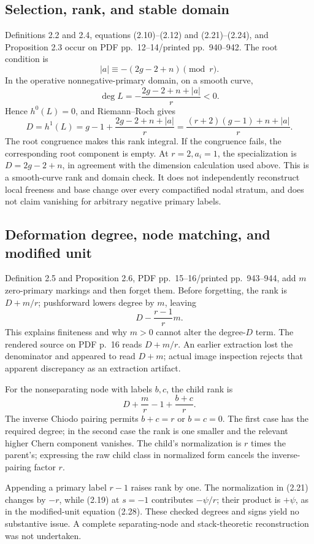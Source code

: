 \documentclass[10pt]{article}
\begin{document}
\subsection*{Selection, rank, and stable domain}
Definitions 2.2 and 2.4, equations (2.10)–(2.12) and (2.21)–(2.24), and Proposition 2.3 occur on PDF pp. 12–14/printed pp. 940–942. The root condition is \[|a|\equiv-(2g-2+n)\pmod r.\] In the operative nonnegative-primary domain, on a smooth curve, \[\deg L=-\frac{2g-2+n+|a|}{r}<0.\] Hence \(h^0(L)=0\), and Riemann–Roch gives \[D=h^1(L)=g-1+\frac{2g-2+n+|a|}{r}
   =\frac{(r+2)(g-1)+n+|a|}{r}.\] The root congruence makes this rank integral. If the congruence fails, the corresponding root component is empty. At \(r=2,a_i=1\), the specialization is \(D=2g-2+n\), in agreement with the dimension calculation used above. This is a smooth-curve rank and domain check. It does not independently reconstruct local freeness and base change over every compactified nodal stratum, and does not claim vanishing for arbitrary negative primary labels.\par
\subsection*{Deformation degree, node matching, and modified unit}
Definition 2.5 and Proposition 2.6, PDF pp. 15–16/printed pp. 943–944, add \(m\) zero-primary markings and then forget them. Before forgetting, the rank is \(D+m/r\); pushforward lowers degree by \(m\), leaving \[D-\frac{r-1}{r}m.\] This explains finiteness and why \(m>0\) cannot alter the degree-\(D\) term. The rendered source on PDF p. 16 reads \(D+m/r\). An earlier extraction lost the denominator and appeared to read \(D+m\); actual image inspection rejects that apparent discrepancy as an extraction artifact.\par
For the nonseparating node with labels \(b,c\), the child rank is \[D+\frac mr-1+\frac{b+c}{r}.\] The inverse Chiodo pairing permits \(b+c=r\) or \(b=c=0\). The first case has the required degree; in the second case the rank is one smaller and the relevant higher Chern component vanishes. The child’s normalization is \(r\) times the parent’s; expressing the raw child class in normalized form cancels the inverse-pairing factor \(r\).\par
Appending a primary label \(r-1\) raises rank by one. The normalization in (2.21) changes by \(-r\), while (2.19) at \(s=-1\) contributes \(-\psi/r\); their product is \(+\psi\), as in the modified-unit equation (2.28). These checked degrees and signs yield no substantive issue. A complete separating-node and stack-theoretic reconstruction was not undertaken.\par
\end{document}
